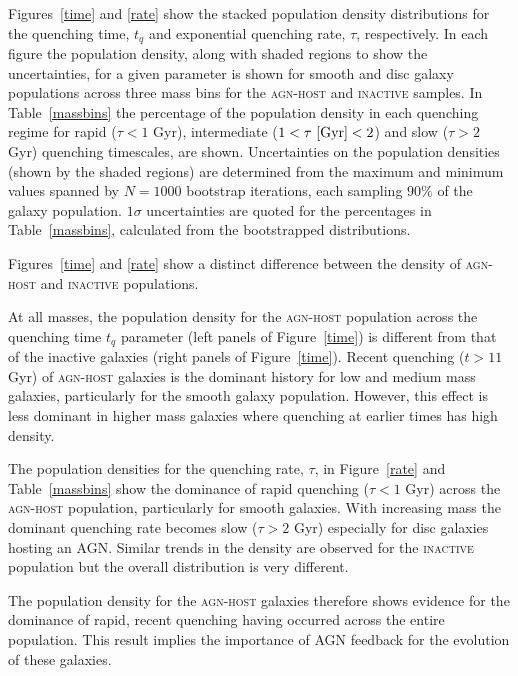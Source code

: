 \documentclass[useAMS,usenatbib]{mn2e}
\def\changed    {\color{nc} }
\def\secondchange    {\color{srv} }
\def\newref    {\color{new} }
\begin{document}
Figures~\ref{time} and \ref{rate} show the stacked {\secondchange population density} distributions for the quenching time, $t_q$ and exponential quenching rate, $\tau$, respectively. In each figure the {\secondchange population density}, along with shaded regions to show the uncertainties, for a given parameter is shown for smooth and {\changed disc galaxy populations} across three mass bins for the \textsc{agn-host} and \textsc{inactive} samples. {\changed In Table~\ref{massbins} the percentage of the {\secondchange population density} in each quenching regime} for rapid ($\tau < 1$ Gyr), intermediate ($1 < \tau ~\rm{[Gyr]} < 2$) and slow ($\tau > 2$ Gyr) quenching timescales, are shown. {\newref Uncertainties on the population densities (shown by the shaded regions) are determined from the maximum and minimum values spanned by $N = 1000$ bootstrap iterations, each sampling $90\%$ of the galaxy population. $1\sigma$ uncertainties are quoted for the percentages in Table~\ref{massbins}, calculated from the bootstrapped distributions.}

 {\changed Figures~\ref{time} and \ref{rate} show} a distinct difference between the {\secondchange density} of \textsc{agn-host} and \textsc{inactive} populations.

At all masses, the {\secondchange population density} for the \textsc{agn-host} population across the quenching time $t_q$ parameter (left panels of Figure~\ref{time}) is different from that of the inactive galaxies (right panels of Figure~\ref{time}). Recent quenching ($t > 11$ Gyr) of \textsc{agn-host} galaxies is the dominant history for low and medium mass galaxies, particularly for the smooth galaxy population. However, this effect is less dominant in higher mass galaxies where quenching at earlier times has {\secondchange high density}.


The {\secondchange population densities} for the quenching rate, $\tau$, in Figure~\ref{rate} and Table~\ref{massbins} show the dominance of rapid quenching ($\tau < 1$ Gyr) across the \textsc{agn-host} population, particularly for smooth galaxies. With increasing mass the dominant quenching rate becomes slow ($\tau > 2$ Gyr) especially for disc galaxies hosting an AGN. Similar trends in the {\secondchange density} are observed for the \textsc{inactive} population but the overall distribution is very different. 


The {\secondchange population density} for the \textsc{agn-host} galaxies therefore shows evidence for the dominance of rapid, recent quenching having occurred across the entire population. This result implies the importance of AGN feedback for the evolution of these galaxies.
\end{document}
